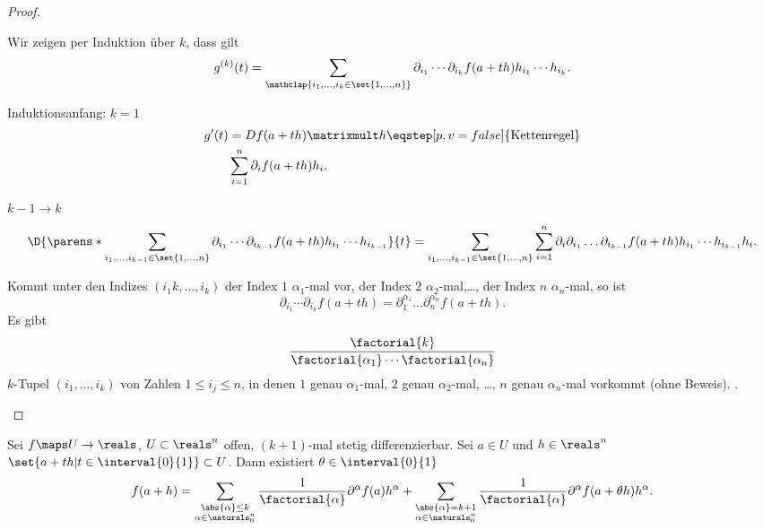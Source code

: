 \begin{proof}
  \begin{proofenumerate}
    \item Wir zeigen per Induktion über \( k \), dass gilt
    \begin{equation*}
      g^{(k)}(t)=\sum_{\mathclap{i_1,\dotsc,i_k\in \set{1,\dotsc,n}}}\partial_{i_1}\dotsb\partial_{i_k} f(a+th)h_{i_1}\dotsb h_{i_k}.
    \end{equation*}
    \begin{proofdescription}
      \item[Induktionsanfang: \( k=1 \)]
      \begin{align*}
        g'(t)&=Df(a+th)\matrixmult h\eqstep[p,v=false]{\text{Kettenregel}}\\
        &\sum_{i=1}^{n}\partial_i f(a+th) h_i.
      \end{align*}
      \item[\( k-1\to k \)]
      \begin{equation*}
        \D{\parens*{\sum_{i_1,\dotsc,i_{k-1}\in \set{1,\dotsc,n}}\partial_{i_1}\dotsb \partial_{i_{k-1}}f(a+th)h_{i_1}\dotsb h_{i_{k-1}}}}{t}=\sum_{i_1,\dotsc,i_{k-1}\in \set{1,\dots,n}} \sum_{i=1}^{n}\partial_i \partial_{i_1}\dotsc \partial_{i_{k-1}} f(a+th) h_{i_1}\dotsb h_{i_{k-1}}h_i.
      \end{equation*} 
    \end{proofdescription}
    \item Kommt unter den Indizes \( (i_1k,\dotsc,i_k) \) der Index \( 1 \) \( \alpha_1 \)-mal vor, der Index \( 2 \) \( \alpha_2 \)-mal,\dots, der Index \( n \) \( \alpha_n \)-mal, so ist 
    \begin{equation*}
      \partial_{i_1}\dotsb\partial_{i_k} f(a+th)=\partial_1^{\alpha_1}\dotsc \partial_n^{\alpha_n}f(a+th).
    \end{equation*}
    Es gibt 
    \begin{equation*}
      \frac{\factorial{k}}{\factorial{\alpha_1}\dotsb \factorial{\alpha_n}}
    \end{equation*}
    \( k \)-Tupel \( (i_1,\dotsc,i_k) \) von Zahlen \( 1\leq i_j\leq n \), in denen \( 1 \) genau \( \alpha_1 \)-mal, \( 2 \) genau \( \alpha_2 \)-mal, \dots, \( n \) genau \( \alpha_n \)-mal vorkommt (ohne Beweis). \timplies \Beh.
  \end{proofenumerate}
\end{proof}
\begin{satz}
  Sei \( f\maps U\to \reals \), \( U\subset \reals^n \) offen, \( (k+1) \)-mal stetig differenzierbar. Sei \( a\in U \) und \( h\in \reals^n \) \sd \( \set{a+th|t\in \interval{0}{1}}\subset U \). Dann existiert \( \theta\in \interval{0}{1} \) \sd
  \begin{equation*}
    f(a+h)=\sum_{\substack{\abs{\alpha}\leq k\\ \alpha\in \naturals_0^n}}\frac{1}{\factorial{\alpha}} \partial^{\alpha} f(a) h^{\alpha} +\sum_{\substack{\abs{\alpha}=k+1\\ \alpha\in \naturals_0^{n}}} \frac{1}{\factorial{\alpha}} \partial^{\alpha} f(a+\theta h) h^{\alpha}.
  \end{equation*}
\end{satz}

